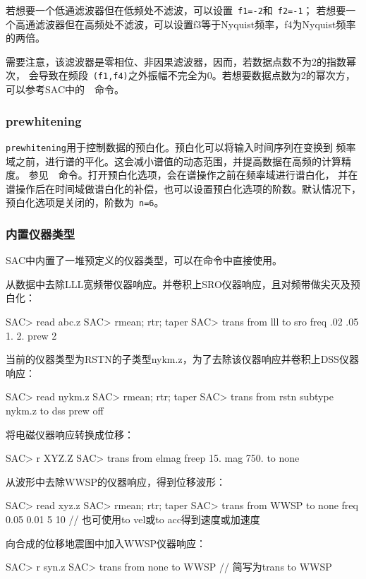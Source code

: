 若想要一个低通滤波器但在低频处不滤波，可以设置~\verb+f1=-2+和~\verb+f2=-1+；
若想要一个高通滤波器但在高频处不滤波，可以设置f3等于Nyquist频率，f4为Nyquist频率的两倍。

需要注意，该滤波器是零相位、非因果滤波器，因而，若数据点数不为2的指数幂次，
会导致在频段~\verb+(f1,f4)+之外振幅不完全为0。若想要数据点数为2的幂次方，
可以参考SAC中的~~命令。

\subsubsection{prewhitening}
\verb+prewhitening+用于控制数据的预白化。预白化可以将输入时间序列在变换到
频率域之前，进行谱的平化。这会减小谱值的动态范围，并提高数据在高频的计算精度。
参见~~命令。打开预白化选项，会在谱操作之前在频率域进行谱白化，
并在谱操作后在时间域做谱白化的补偿，也可以设置预白化选项的阶数。默认情况下，
预白化选项是关闭的，阶数为~\verb+n=6+。

\subsubsection{内置仪器类型}
SAC中内置了一堆预定义的仪器类型，可以在命令中直接使用。

从数据中去除LLL宽频带仪器响应。并卷积上SRO仪器响应，且对频带做尖灭及预白化：
\begin{SACCode}
SAC> read abc.z
SAC> rmean; rtr; taper
SAC> trans from lll to sro freq .02 .05 1. 2. prew 2
\end{SACCode}

当前的仪器类型为RSTN的子类型nykm.z，为了去除该仪器响应并卷积上DSS仪器响应：
\begin{SACCode}
SAC> read nykm.z
SAC> rmean; rtr; taper
SAC> trans from rstn subtype nykm.z to dss prew off
\end{SACCode}

将电磁仪器响应转换成位移：
\begin{SACCode}
SAC> r XYZ.Z
SAC> trans from elmag freep 15. mag 750. to none
\end{SACCode}

从波形中去除WWSP的仪器响应，得到位移波形：
\begin{SACCode}
SAC> read xyz.z
SAC> rmean; rtr; taper
SAC> trans from WWSP to none freq 0.05 0.01 5 10
                // 也可使用to vel或to acc得到速度或加速度
\end{SACCode}

向合成的位移地震图中加入WWSP仪器响应：
\begin{SACCode}
SAC> r syn.z
SAC> trans from none to WWSP    // 简写为trans to WWSP
\end{SACCode}

